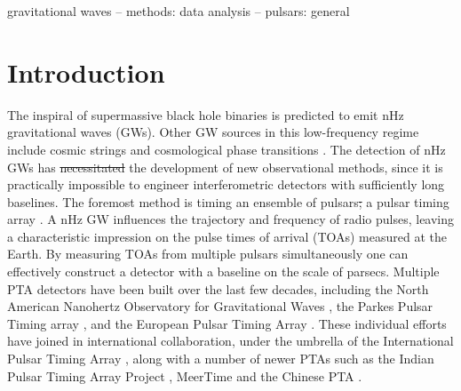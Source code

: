 \documentclass[fleqn,usenatbib,useAMS]{mnras}
\providecommand{\DIFadd}[1]{{\protect\color{blue}\uwave{#1}}} %
\providecommand{\DIFdel}[1]{{\protect\color{red}\sout{#1}}}                      %
\providecommand{\DIFaddbegin}{} %
\providecommand{\DIFaddend}{} %
\providecommand{\DIFdelbegin}{} %
\providecommand{\DIFdelend}{} %
\newcommand{\DIFscaledelfig}{0.5}
\newlength{\DIFdelgraphicswidth} %
\newlength{\DIFdelgraphicsheight} %
\newcommand{\DIFaddincludegraphics}[2][]{{\color{blue}\fbox{\DIFOincludegraphics[#1]{#2}}}} %
\newcommand{\DIFdelincludegraphics}[2][]{%
\sbox{\DIFdelgraphicsbox}{\DIFOincludegraphics[#1]{#2}}%
\settoboxwidth{\DIFdelgraphicswidth}{\DIFdelgraphicsbox} %
\settoboxtotalheight{\DIFdelgraphicsheight}{\DIFdelgraphicsbox} %
\scalebox{\DIFscaledelfig}{%
\parbox[b]{\DIFdelgraphicswidth}{\usebox{\DIFdelgraphicsbox}\\[-\baselineskip] \rule{\DIFdelgraphicswidth}{0em}}\llap{\resizebox{\DIFdelgraphicswidth}{\DIFdelgraphicsheight}{%
\setlength{\unitlength}{\DIFdelgraphicswidth}%
\begin{picture}(1,1)%
\thicklines\linethickness{2pt} %
{\color[rgb]{1,0,0}\put(0,0){\framebox(1,1){}}}%
{\color[rgb]{1,0,0}\put(0,0){\line( 1,1){1}}}%
{\color[rgb]{1,0,0}\put(0,1){\line(1,-1){1}}}%
\end{picture}%
}\hspace*{3pt}}} %
} %
\DeclareRobustCommand{\DIFaddbegin}{\DIFOaddbegin \let\includegraphics\DIFaddincludegraphics} %
\DeclareRobustCommand{\DIFaddend}{\DIFOaddend \let\includegraphics\DIFOincludegraphics} %
\DeclareRobustCommand{\DIFdelbegin}{\DIFOdelbegin \let\includegraphics\DIFdelincludegraphics} %
\DeclareRobustCommand{\DIFdelend}{\DIFOaddend \let\includegraphics\DIFOincludegraphics} %
\begin{document}
\begin{keywords}
gravitational waves -- methods: data analysis -- pulsars: general
\end{keywords}



\begingroup
\let\clearpage\relax
\endgroup
\newpage
\section{Introduction}\label{sec:intro}
The inspiral of supermassive black hole binaries \citep[SMBHBs;][]{Rajagopal1995,Jaffe_2003, Wyithe2003,Sesana2013,McWilliams_2014,Ravi2015MNRAS.447.2772R,Burke2019, Skyes2022} is predicted to emit nHz gravitational waves (GWs). Other GW sources in this low-frequency regime include cosmic strings \citep[e.g.][]{PTAstring} and cosmological phase transitions \citep[e.g.][]{PTAphase}. The detection of nHz GWs has \DIFdelbegin \DIFdel{necessitated }\DIFdelend \DIFaddbegin \DIFadd{inspired }\DIFaddend the development of new observational methods, since it is practically impossible to engineer interferometric detectors with sufficiently long baselines. The foremost method is timing an ensemble of pulsars\DIFdelbegin \DIFdel{; }\DIFdelend \DIFaddbegin \DIFadd{, i.e. }\DIFaddend a pulsar timing array \citep[PTA;][]{ Tiburzi2018, 2021hgwa.bookE...4V}. A nHz GW influences the trajectory and frequency of radio pulses, leaving a characteristic impression on the pulse times of arrival (TOAs) measured at the  Earth. By measuring TOAs from multiple pulsars simultaneously one can effectively construct a detector with a baseline on the scale of parsecs. Multiple PTA detectors have been built over the last few decades, including the North American Nanohertz Observatory for Gravitational Waves \citep[NANOGrav,][]{NANOgrav2023}, the Parkes Pulsar Timing array \citep[PPTA,][]{Parkes2023}, and the European Pulsar Timing Array \citep[EPTA,][]{EPTA2023}. These individual efforts have joined in international collaboration, under the umbrella of the International Pulsar Timing Array \citep[IPTA,][]{2019MNRAS.490.4666P}, along with a number of newer PTAs such as the Indian Pulsar Timing Array Project \citep[InPTA,][]{ipta}, MeerTime \citep{meertime2,Meertime} and the Chinese PTA \citep[CPTA,][]{Hobbs_2019}. \newline 
\end{document}
